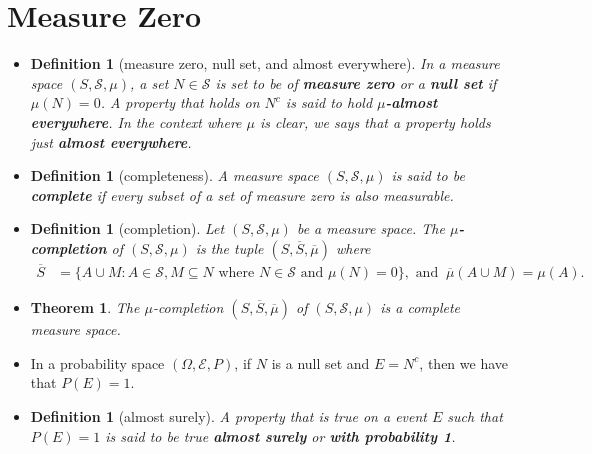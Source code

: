 \documentclass[10pt]{article}
\newtheorem{theorem}[lemma]{Theorem}
\newtheorem{definition}[lemma]{Definition}
\numberwithin{lemma}{section}
\newcommand{\mcal}[1]{\mathcal{#1}}
\begin{document}
\section{Measure Zero}

\begin{itemize}
  \item \begin{definition}[measure zero, null set, and almost everywhere]
    In a measure space $(S, \mcal{S}, \mu)$, a set $N \in \mcal{S}$ is set to be of {\bf measure zero} or a {\bf null set} if $\mu(N) = 0$. A property that holds on $N^c$ is said to hold {\bf $\mu$-almost everywhere}. In the context where $\mu$ is clear, we says that a property holds just {\bf almost everywhere}.
  \end{definition}

  \item \begin{definition}[completeness]
    A measure space $(S, \mcal{S}, \mu)$ is said to be {\bf complete} if every subset of a set of measure zero is also measurable.
  \end{definition}

  \item \begin{definition}[completion]
    Let $(S, \mcal{S}, \mu)$ be a measure space. The {\bf $\mu$-completion} of $(S,\mcal{S},\mu)$ is the tuple $(S, \overline{S}, \overline{\mu})$ where
    \begin{align*}
      \overline{S} &= \{ A \cup M : A \in \mcal{S}, M \subseteq N \mbox{ where } N \in \mcal{S} \mbox{ and } \mu(N) = 0 \}, \mbox{ and }\  
      \overline{\mu}(A \cup M) = \mu(A).
    \end{align*}
  \end{definition}

  \item \begin{theorem}
    The $\mu$-completion $(S, \overline{S}, \overline{\mu})$ of $(S, \mcal{S}, \mu)$ is a complete measure space.
  \end{theorem}

  \item In a probability space $(\Omega, \mcal{E}, P)$, if $N$ is a null set and $E = N^c$, then we have that $P(E) = 1$.

  \item \begin{definition}[almost surely]
    A property that is true on a event $E$ such that $P(E) = 1$ is said to be true {\bf almost surely} or {\bf with probability 1}.
  \end{definition}


\end{itemize}
\end{document}
